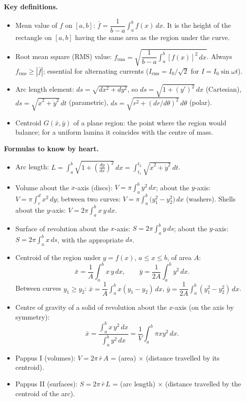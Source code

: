\documentclass[11pt]{article}
\newcommand{\cle}[1]{{\popxbold\color{popdark}#1}}
\begin{document}
\begin{bilan}
\textbf{Key definitions.}
\begin{itemize}
\item \cle{Mean value} of $f$ on $[a,b]$: $\bar{f}=\dfrac{1}{b-a}\displaystyle\int_a^b f(x)\,dx$. It is the height of the rectangle on $[a,b]$ having the same area as the region under the curve.
\item \cle{Root mean square (RMS) value}: $f_{\mathrm{rms}}=\sqrt{\dfrac{1}{b-a}\displaystyle\int_a^b [f(x)]^2\,dx}$. Always $f_{\mathrm{rms}}\geq |\bar{f}|$; essential for alternating currents ($I_{\mathrm{rms}}=I_0/\sqrt{2}$ for $I=I_0\sin\omega t$).
\item \cle{Arc length element}: $ds=\sqrt{dx^2+dy^2}$, so $ds=\sqrt{1+(y')^2}\,dx$ (Cartesian), $ds=\sqrt{\dot{x}^2+\dot{y}^2}\,dt$ (parametric), $ds=\sqrt{r^2+(dr/d\theta)^2}\,d\theta$ (polar).
\item \cle{Centroid} $G(\bar{x},\bar{y})$ of a plane region: the point where the region would balance; for a uniform lamina it coincides with the centre of mass.
\end{itemize}

\textbf{Formulas to know by heart.}
\begin{itemize}
\item Arc length: $L=\displaystyle\int_a^b\sqrt{1+\left(\tfrac{dy}{dx}\right)^2}\,dx=\int_{t_1}^{t_2}\sqrt{\dot{x}^2+\dot{y}^2}\,dt$.
\item Volume about the $x$-axis (discs): $V=\pi\displaystyle\int_a^b y^2\,dx$; about the $y$-axis: $V=\pi\displaystyle\int_c^d x^2\,dy$; between two curves: $V=\pi\displaystyle\int_a^b\big(y_1^2-y_2^2\big)\,dx$ (washers). Shells about the $y$-axis: $V=2\pi\displaystyle\int_a^b x\,y\,dx$.
\item Surface of revolution about the $x$-axis: $S=2\pi\displaystyle\int_a^b y\,ds$; about the $y$-axis: $S=2\pi\displaystyle\int_a^b x\,ds$, with the appropriate $ds$.
\item Centroid of the region under $y=f(x)$, $a\leq x\leq b$, of area $A$:
\[\bar{x}=\frac{1}{A}\int_a^b x\,y\,dx,\qquad \bar{y}=\frac{1}{2A}\int_a^b y^2\,dx.\]
Between curves $y_1\geq y_2$: $\bar{x}=\dfrac{1}{A}\displaystyle\int_a^b x(y_1-y_2)\,dx$, $\bar{y}=\dfrac{1}{2A}\displaystyle\int_a^b (y_1^2-y_2^2)\,dx$.
\item Centre of gravity of a solid of revolution about the $x$-axis (on the axis by symmetry):
\[\bar{x}=\frac{\displaystyle\int_a^b x\,y^2\,dx}{\displaystyle\int_a^b y^2\,dx}=\frac{1}{V}\int_a^b \pi x y^2\,dx.\]
\item \cle{Pappus I} (volumes): $V=2\pi\,\bar{r}\,A$ = (area) $\times$ (distance travelled by its centroid).
\item \cle{Pappus II} (surfaces): $S=2\pi\,\bar{r}\,L$ = (arc length) $\times$ (distance travelled by the centroid of the arc).
\end{itemize}


\end{bilan}
\end{document}
